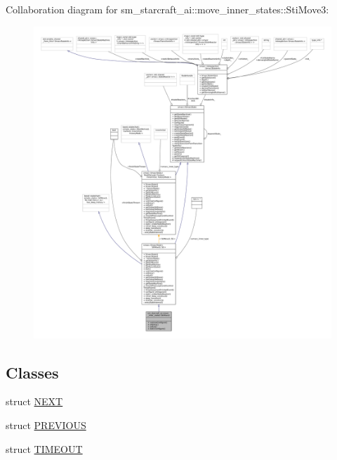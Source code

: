 Collaboration diagram for sm\+\_\+starcraft\+\_\+ai\+:\+:move\+\_\+inner\+\_\+states\+:\+:Sti\+Move3\+:
\nopagebreak
\begin{figure}[H]
\begin{center}
\leavevmode
\includegraphics[width=350pt]{structsm__starcraft__ai_1_1move__inner__states_1_1StiMove3__coll__graph}
\end{center}
\end{figure}
\subsection*{Classes}
\begin{DoxyCompactItemize}
\item 
struct \hyperlink{structsm__starcraft__ai_1_1move__inner__states_1_1StiMove3_1_1NEXT}{N\+E\+XT}
\item 
struct \hyperlink{structsm__starcraft__ai_1_1move__inner__states_1_1StiMove3_1_1PREVIOUS}{P\+R\+E\+V\+I\+O\+US}
\item 
struct \hyperlink{structsm__starcraft__ai_1_1move__inner__states_1_1StiMove3_1_1TIMEOUT}{T\+I\+M\+E\+O\+UT}
\end{DoxyCompactItemize}
